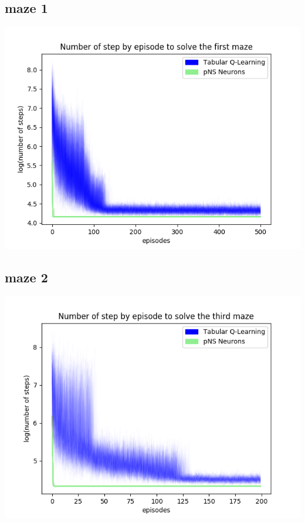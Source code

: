 \documentclass[10pt]{article}
\begin{document}
\subsection{maze 1}
\indent\indent\indent\indent\includegraphics[scale=0.48]{Figure_log_final.png}\\

\subsection{maze 2}
\indent\indent\indent\indent\includegraphics[scale=0.48]{Figure_log_final2.png}\\
\end{document}
